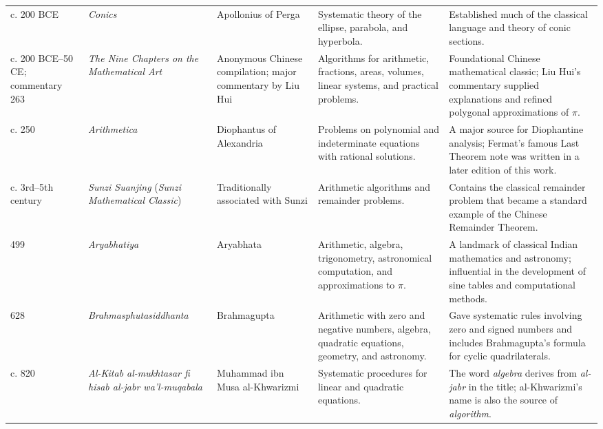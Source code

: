 {\begin{longtable}{@{}L{0.08\textwidth}L{0.21\textwidth}L{0.15\textwidth}L{0.22\textwidth}L{0.26\textwidth}@{}}
        c. 200 BCE
        & \textit{Conics}
        & Apollonius of Perga
        & Systematic theory of the ellipse, parabola, and hyperbola.
        & Established much of the classical language and theory of conic sections. \\

        c. 200 BCE--50 CE; commentary 263
        & \textit{The Nine Chapters on the Mathematical Art}
        & Anonymous Chinese compilation; major commentary by Liu Hui
        & Algorithms for arithmetic, fractions, areas, volumes, linear systems, and practical problems.
        & Foundational Chinese mathematical classic; Liu Hui's commentary supplied explanations and refined polygonal approximations of $\pi$. \\

        c. 250
        & \textit{Arithmetica}
        & Diophantus of Alexandria
        & Problems on polynomial and indeterminate equations with rational solutions.
        & A major source for Diophantine analysis; Fermat's famous Last Theorem note was written in a later edition of this work. \\

        c. 3rd--5th century
        & \textit{Sunzi Suanjing} (\textit{Sunzi Mathematical Classic})
        & Traditionally associated with Sunzi
        & Arithmetic algorithms and remainder problems.
        & Contains the classical remainder problem that became a standard example of the Chinese Remainder Theorem. \\

        499
        & \textit{Aryabhatiya}
        & Aryabhata
        & Arithmetic, algebra, trigonometry, astronomical computation, and approximations to $\pi$.
        & A landmark of classical Indian mathematics and astronomy; influential in the development of sine tables and computational methods. \\

        628
        & \textit{Brahmasphutasiddhanta}
        & Brahmagupta
        & Arithmetic with zero and negative numbers, algebra, quadratic equations, geometry, and astronomy.
        & Gave systematic rules involving zero and signed numbers and includes Brahmagupta's formula for cyclic quadrilaterals. \\

        c. 820
        & \textit{Al-Kitab al-mukhtasar fi hisab al-jabr wa'l-muqabala}
        & Muhammad ibn Musa al-Khwarizmi
        & Systematic procedures for linear and quadratic equations.
        & The word \emph{algebra} derives from \emph{al-jabr} in the title; al-Khwarizmi's name is also the source of \emph{algorithm}. \\


\end{longtable}}
